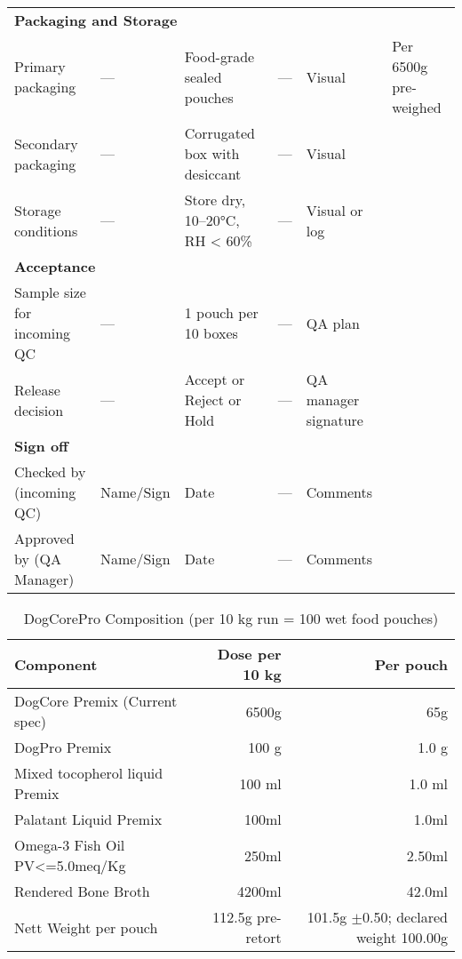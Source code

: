 \begin{longtable}{@{}p{6.0cm}p{1.5cm}p{1.8cm}p{2.0cm}p{3.0cm}p{3.0cm}@{}}
\multicolumn{6}{l}{\textbf{Packaging and Storage}} \\[3pt]
Primary packaging & --- & Food-grade sealed pouches & --- & Visual & Per 6500g pre-weighed \\[3pt]
Secondary packaging & --- & Corrugated box with desiccant & --- & Visual & \\[3pt]
Storage conditions & --- & Store dry, 10--20°C, RH < 60\% & --- & Visual or log & \\[6pt]

\multicolumn{6}{l}{\textbf{Acceptance}} \\[3pt]
Sample size for incoming QC & --- & 1 pouch per 10 boxes & --- & QA plan & \\[3pt]
Release decision & --- & Accept or Reject or Hold & --- & QA manager signature & \\[6pt]

\multicolumn{6}{l}{\textbf{Sign off}} \\[3pt]
Checked by (incoming QC) & Name/Sign & Date & --- & Comments & \\[12pt]
Approved by (QA Manager) & Name/Sign & Date & --- & Comments & \\
\bottomrule
\end{longtable}
\vspace{0.5em}

\begin{table}[h]
\centering
\caption{DogCorePro Composition (per 10 kg run = 100  wet food pouches)}
\label{tab:dogcore_premix}
\begin{tabular}{@{}l r r@{}}
\toprule
\textbf{Component} & \textbf{Dose per 10 kg} & \textbf{Per pouch} \\
\midrule
DogCore Premix (Current spec) & 6500g & 65g \\ [3pt]
\midrule 
DogPro Premix & 100 g & 1.0 g \\[3pt]
Mixed tocopherol liquid Premix & 100 ml & 1.0 ml \\[3pt]
Palatant Liquid Premix & 100ml & 1.0ml \\[3pt]
Omega-3 Fish Oil PV<=5.0meq/Kg & 250ml & 2.50ml \\[3pt]
\midrule
Rendered Bone Broth & 4200ml & 42.0ml \\[3pt]
\midrule
Nett Weight per pouch & 112.5g pre-retort & 101.5g $\pm$0.50; declared weight 100.00g\\[3pt]
\midrule
\bottomrule
\end{tabular}
\end{table}
\vspace{1em}

